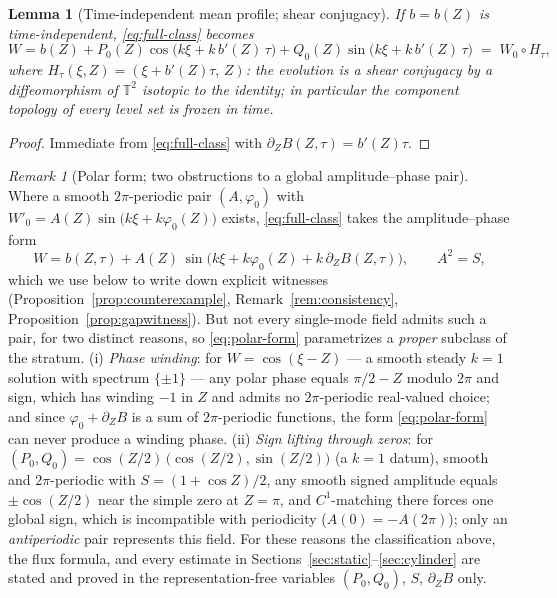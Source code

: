 \documentclass[11pt]{amsart}
\newtheorem{lemma}[theorem]{Lemma}
\theoremstyle{definition}
\theoremstyle{remark}
\newtheorem{remark}[theorem]{Remark}
\newcommand{\T}{\mathbb{T}}
\begin{document}
\begin{lemma}[Time-independent mean profile; shear conjugacy]
\label{lem:class-static}
If $b=b(Z)$ is time-independent, \eqref{eq:full-class} becomes
\begin{equation}\label{eq:static-class}
  W=b(Z)+P_0(Z)\cos\bigl(k\xi+k\,b'(Z)\,\tau\bigr)
   +Q_0(Z)\sin\bigl(k\xi+k\,b'(Z)\,\tau\bigr)
  \;=\;W_0\circ H_\tau,
\end{equation}
where $H_\tau(\xi,Z)=(\xi+b'(Z)\tau,\,Z)$: the evolution is a shear
conjugacy by a diffeomorphism of $\T^2$ isotopic to the identity; in
particular the component topology of every level set is frozen in time.
\end{lemma}

\begin{proof}
Immediate from \eqref{eq:full-class} with
$\partial_ZB(Z,\tau)=b'(Z)\tau$.
\end{proof}

\begin{remark}[Polar form; two obstructions to a global amplitude--phase
pair]\label{rem:polar}
Where a smooth $2\pi$-periodic pair $(A,\varphi_0)$ with
$W'_0=A(Z)\sin\bigl(k\xi+k\varphi_0(Z)\bigr)$ exists,
\eqref{eq:full-class} takes the amplitude--phase form
\begin{equation}\label{eq:polar-form}
  W=b(Z,\tau)
  +A(Z)\,\sin\bigl(k\xi+k\varphi_0(Z)+k\,\partial_ZB(Z,\tau)\bigr),
  \qquad A^2=S ,
\end{equation}
which we use below to write down explicit witnesses
(Proposition~\ref{prop:counterexample}, Remark~\ref{rem:consistency},
Proposition~\ref{prop:gapwitness}). But not every single-mode field
admits such a pair, for two distinct reasons, so \eqref{eq:polar-form}
parametrizes a \emph{proper} subclass of the stratum.
(i) \emph{Phase winding}: for $W=\cos(\xi-Z)$ --- a smooth steady $k=1$
solution with spectrum $\{\pm1\}$ --- any polar phase equals $\pi/2-Z$
modulo $2\pi$ and sign, which has winding $-1$ in $Z$ and admits no
$2\pi$-periodic real-valued choice; and since $\varphi_0+\partial_ZB$ is
a sum of $2\pi$-periodic functions, the form \eqref{eq:polar-form} can
never produce a winding phase.
(ii) \emph{Sign lifting through zeros}: for
$(P_0,Q_0)=\cos(Z/2)\,\bigl(\cos(Z/2),\sin(Z/2)\bigr)$ (a $k=1$ datum),
smooth and $2\pi$-periodic with $S=(1+\cos Z)/2$, any smooth signed
amplitude equals $\pm\cos(Z/2)$ near the simple zero at $Z=\pi$, and
$C^1$-matching there forces one global sign, which is incompatible with
periodicity ($A(0)=-A(2\pi)$); only an \emph{antiperiodic} pair
represents this field. For these reasons the classification above, the
flux formula, and every estimate in
Sections~\ref{sec:static}--\ref{sec:cylinder} are stated and proved in
the representation-free variables $(P_0,Q_0)$, $S$, $\partial_ZB$ only.
\end{remark}
\end{document}
